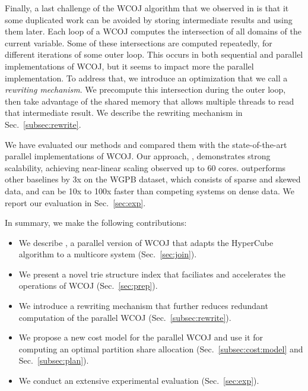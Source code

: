 Finally, a last challenge of the WCOJ algorithm that we observed in
\name is that it some duplicated work can be avoided by storing
intermediate results and using them later.  Each loop of a WCOJ
computes the intersection of all domains of the current variable.
Some of these intersections are computed repeatedly, for different
iterations of some outer loop.  This occurs in both sequential and
parallel implementations of WCOJ, but it seems to impact more the
parallel implementation.  To address that, we introduce an
optimization that we call a \emph{rewriting mechanism}.  We precompute
this intersection during the outer loop, then take advantage of the
shared memory that allows multiple threads to read that intermediate
result.  We describe the rewriting mechanism in
Sec.~\ref{subsec:rewrite}.

We have evaluated our methods and compared them with the state-of-the-art
parallel implementations of WCOJ. Our approach, \name, demonstrates
strong scalability, achieving near-linear scaling observed up to 60 cores.
\name outperforms other baselines by 3x on the WGPB dataset, which
consists of sparse and skewed data, and can be 10x to 100x faster than
competing systems on dense data.  We report our evaluation in
Sec.~\ref{sec:exp}.

In summary, we make the following contributions: 

\begin{itemize}
\item We describe \name, a parallel version of WCOJ that adapts the
  HyperCube algorithm to a multicore system (Sec.~\ref{sec:join}).
\item We present a novel trie structure index \indexlayout that faciliates and accelerates the operations of WCOJ (Sec.~\ref{sec:prep}).
\item We introduce a rewriting mechanism that further reduces redundant
  computation of the parallel WCOJ (Sec.~\ref{subsec:rewrite}).
\item We propose a new cost model for the parallel WCOJ and use it for
  computing an optimal partition share allocation (Sec.~\ref{subsec:cost:model} and Sec.~\ref{subsec:plan}).
\item We conduct an extensive experimental evaluation
  (Sec.~\ref{sec:exp}).
\end{itemize}

